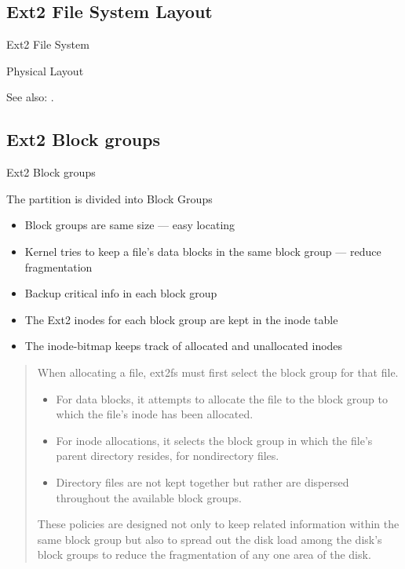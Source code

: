 \subsection{Ext2 File System Layout}

\begin{frame}{Ext2 File System}
  \begin{block}{Physical Layout}
    \begin{center}
       
    \end{center}
  \end{block}
\end{frame}

See also: .

\subsection{Ext2 Block groups}

\begin{frame}{Ext2 Block groups}
  \begin{block}{The partition is divided into \alert{Block Groups}}
    \begin{itemize}
    \item Block groups are same size --- easy locating
    \item Kernel tries to keep a file's data blocks in the same block group --- reduce
      fragmentation
    \item Backup critical info in each block group
    \item The Ext2 inodes for each block group are kept in the \alert{inode
        table}
    \item The \alert{inode-bitmap} keeps track of allocated and unallocated
      inodes
    \end{itemize}
  \end{block}
\end{frame}

\begin{quote}
  When allocating a file, ext2fs must first select the block group for that
  file.
  \begin{itemize}
  \item For data blocks, it attempts to allocate the file to the block group to which the
    file's inode has been allocated.
  \item For inode allocations, it selects the block group in which the file's parent
    directory resides, for nondirectory files.
  \item Directory files are not kept together but rather are dispersed throughout the
    available block groups.
  \end{itemize}
  These policies are designed not only to keep related information within the same block
  group but also to spread out the disk load among the disk's block groups to reduce the
  fragmentation of any one area of the disk.
\end{quote}

